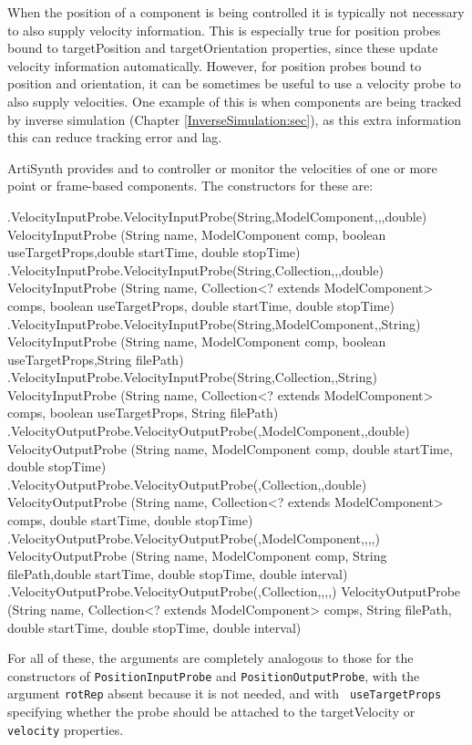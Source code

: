 When the position of a component is being controlled it is typically not
necessary to also supply velocity information. This is especially true for
position probes bound to {\sf targetPosition} and {\sf targetOrientation}
properties, since these update velocity information automatically. However, for
position probes bound to {\sf position} and {\sf orientation}, it can be
sometimes be useful to use a velocity probe to also supply velocities.  One
example of this is when components are being tracked by inverse simulation
(Chapter
\ref{InverseSimulation:sec}), as this extra information this can reduce
tracking error and lag.

ArtiSynth provides 
 and
to controller or monitor the velocities of one or more point or frame-based
components. The constructors for these are:
%
\begin{methodtable}{0.9}{0.1}
\midline
%
\methodentry
{\probes.VelocityInputProbe.VelocityInputProbe(String,ModelComponent,,,double)}%
{VelocityInputProbe (String name, ModelComponent comp, 
boolean useTargetProps,\brh double startTime, double stopTime)}%
{\ }%
%
\methodspace{0.5em}%
\methodentry
{\probes.VelocityInputProbe.VelocityInputProbe(String,Collection,,,double)}%
{VelocityInputProbe (String name, Collection<? extends ModelComponent> comps,\brh
boolean useTargetProps, double startTime, double stopTime)}%
{\ }%
%
\methodspace{0.5em}%
\methodentry
{\probes.VelocityInputProbe.VelocityInputProbe(String,ModelComponent,,String)}%
{VelocityInputProbe (String name, ModelComponent comp,
boolean useTargetProps,\brh String filePath)}%
{\ }%
%
\methodspace{0.5em}%
\methodentry
{\probes.VelocityInputProbe.VelocityInputProbe(String,Collection,,String)}%
{VelocityInputProbe (String name, Collection<? extends ModelComponent> comps,\brh
boolean useTargetProps, String filePath)}%
{\ }%
\methodspace{1.05em}%
\methodentry
{\probes.VelocityOutputProbe.VelocityOutputProbe(,ModelComponent,,double)}%
{VelocityOutputProbe (String name, ModelComponent comp,\brh
double startTime, double stopTime)}%
{\ }%
%
\methodspace{0.5em}%
\methodentry
{\probes.VelocityOutputProbe.VelocityOutputProbe(,Collection,,double)}%
{VelocityOutputProbe (String name, Collection<? extends ModelComponent> comps,\brh
double startTime, double stopTime)}%
{\ }%
%
\methodspace{0.5em}%
\methodentry
{\probes.VelocityOutputProbe.VelocityOutputProbe(,ModelComponent,,,,)}%
{VelocityOutputProbe (String name, ModelComponent comp,
String filePath,\brh double startTime, double stopTime, double interval)}%
{\ }%
%
\methodspace{0.5em}%
\methodentry
{\probes.VelocityOutputProbe.VelocityOutputProbe(,Collection,,,,)}%
{VelocityOutputProbe (String name, Collection<? extends ModelComponent> comps,\brh
String filePath, double startTime, double stopTime, 
double interval)}%
{\ }%
\midline
\end{methodtable}
%
For all of these, the arguments are completely analogous to those for the
constructors of {\tt PositionInputProbe} and {\tt PositionOutputProbe}, with
the argument {\tt rotRep} absent because it is not needed, and with {\tt
useTargetProps} specifying whether the probe should be attached to the {\sf
targetVelocity} or {\tt velocity} properties.

